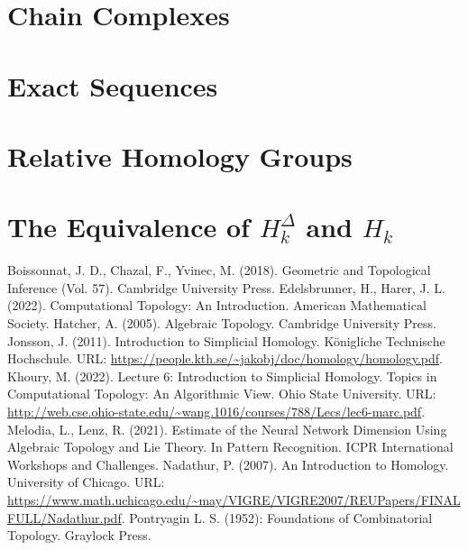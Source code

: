 \documentclass{article}
\begin{document}
\section{Chain Complexes}
\section{Exact Sequences}
\section{Relative Homology Groups}
\section{The Equivalence of $H_k^\Delta$ and $H_k$}

\begin{thebibliography}{100}
 Boissonnat, J. D., Chazal, F., Yvinec, M. (2018). Geometric and Topological Inference (Vol. 57). Cambridge University Press.
 Edelsbrunner, H., Harer, J. L. (2022). Computational Topology: An Introduction. American Mathematical Society.
 Hatcher, A. (2005). Algebraic Topology. Cambridge University Press.
 Jonsson, J. (2011). Introduction to Simplicial Homology. Königliche Technische Hochschule. URL: \url{https://people.kth.se/~jakobj/doc/homology/homology.pdf}.
 Khoury, M. (2022). Lecture 6: Introduction to Simplicial Homology. Topics in Computational Topology: An Algorithmic View. Ohio State University. URL: \url{http://web.cse.ohio-state.edu/~wang.1016/courses/788/Lecs/lec6-marc.pdf}.
 Melodia, L., Lenz, R. (2021). Estimate of the Neural Network Dimension Using Algebraic Topology and Lie Theory. In Pattern Recognition. ICPR International Workshops and Challenges.
 Nadathur, P. (2007). An Introduction to Homology. University of Chicago. URL: \url{https://www.math.uchicago.edu/~may/VIGRE/VIGRE2007/REUPapers/FINALFULL/Nadathur.pdf}.
 Pontryagin L. S. (1952): Foundations of Combinatorial Topology. Graylock Press.
\end{thebibliography}
\end{document}
